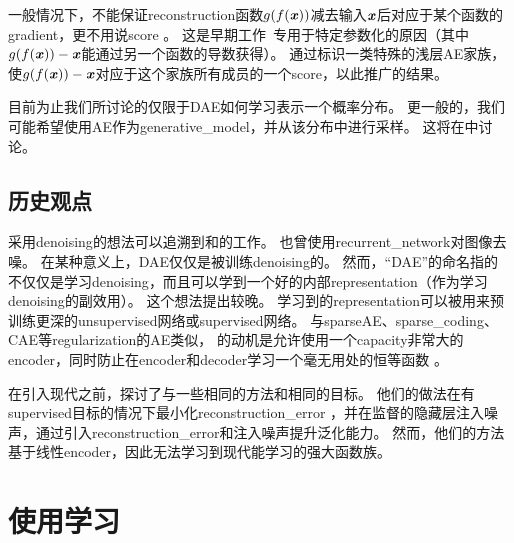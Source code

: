 一般情况下，不能保证\gls{reconstruction}函数$g(f(\boldsymbol{\mathit{x}}))$减去输入$\boldsymbol{\mathit{x}}$后对应于某个函数的\gls{gradient}，更不用说\gls{score} 。
这是早期工作~\citep{Vincent-NC-2011-small}专用于特定参数化的原因（其中$g(f(\boldsymbol{\mathit{x}})) - \boldsymbol{\mathit{x}}$能通过另一个函数的导数获得）。
\citet{Kamyshanska+Memisevic-2015}通过标识一类特殊的浅层\gls{AE}家族，使$g(f(\boldsymbol{\mathit{x}})) - \boldsymbol{\mathit{x}}$对应于这个家族所有成员的一个\gls{score}，以此推广\citet{Vincent-NC-2011-small}的结果。


目前为止我们所讨论的仅限于\gls{DAE}如何学习表示一个概率分布。
更一般的，我们可能希望使用\gls{AE}作为\gls{generative_model}，并从该分布中进行采样。
这将在中讨论。


\subsection{历史观点}
\label{sec:historical_perspective_chap14}
采用\gls{denoising}的想法可以追溯到\cite{Lecun-these87}和\citet{Gallinari87}的工作。
\citet{Behnke-2001}也曾使用\gls{recurrent_network}对图像去噪。
在某种意义上，\gls{DAE}仅仅是被训练\gls{denoising}的。
然而，``\gls{DAE}''的命名指的不仅仅是学习\gls{denoising}，而且可以学到一个好的内部\gls{representation}（作为学习\gls{denoising}的副效用）。
这个想法提出较晚\citep{VincentPLarochelleH2008-small,Vincent-JMLR-2010-small}。
学习到的\gls{representation}可以被用来预训练更深的\gls{unsupervised}网络或\gls{supervised}网络。
与\gls{sparse}\gls{AE}、\gls{sparse_coding}、\gls{CAE}等\gls{regularization}的\gls{AE}类似， 的动机是允许使用一个\gls{capacity}非常大的\gls{encoder}，同时防止在\gls{encoder}和\gls{decoder}学习一个毫无用处的恒等函数 。


在引入现代之前，\citet{Inayoshi-and-Kurita-2005}探讨了与一些相同的方法和相同的目标。
他们的做法在有\gls{supervised}目标的情况下最小化\gls{reconstruction_error} ，并在监督的隐藏层注入噪声，通过引入\gls{reconstruction_error}和注入噪声提升泛化能力。
然而，他们的方法基于线性\gls{encoder}，因此无法学习到现代能学习的强大函数族。



\section{使用学习}
\label{sec:learning_manifolds_with_autoencoders}

